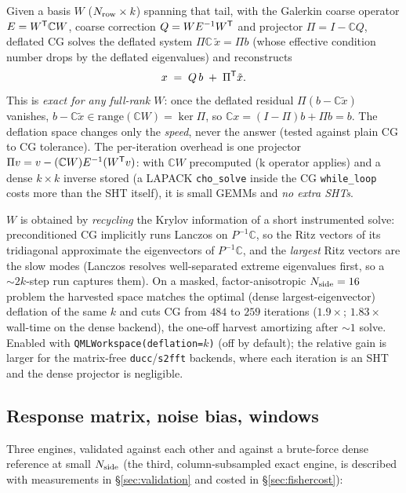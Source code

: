 \documentclass[11pt,a4paper]{article}
\newcommand{\C}{\mathbb{C}}
\begin{document}
Given a basis $W$ ($N_{\rm row}\times k$) spanning that tail, with the
Galerkin coarse operator $E=W^{\sf T}\C W$, coarse correction
$Q=W E^{-1}W^{\sf T}$ and projector $\Pi = I-\C Q$, deflated CG solves the
deflated system $\Pi\C\,\tilde x = \Pi b$ (whose effective condition number
drops by the deflated eigenvalues) and reconstructs
\begin{equation}
  x \;=\; Q\,b \;+\; \Pi^{\sf T}\tilde x .
  \label{eq:deflrecon}
\end{equation}
This is \emph{exact for any full-rank $W$}: once the deflated residual
$\Pi(b-\C\tilde x)$ vanishes, $b-\C\tilde x\in\mathrm{range}(\C W)=\ker\Pi$,
so $\C x=(I-\Pi)b+\Pi b=b$.  The deflation space changes only the
\emph{speed}, never the answer (tested against plain CG to CG tolerance).
The per-iteration overhead is one projector
$\Pi v=v-(\C W)E^{-1}(W^{\sf T}v)$: with $\C W$ precomputed (k operator
applies) and a dense $k\times k$ inverse stored (a LAPACK \texttt{cho\_solve}
inside the CG \texttt{while\_loop} costs more than the SHT itself), it is
small GEMMs and \emph{no extra SHTs}.

$W$ is obtained by \emph{recycling} the Krylov information of a short
instrumented solve: preconditioned CG implicitly runs Lanczos on $P^{-1}\C$,
so the Ritz vectors of its tridiagonal approximate the eigenvectors of
$P^{-1}\C$, and the \emph{largest} Ritz vectors are the slow modes (Lanczos
resolves well-separated extreme eigenvalues first, so a $\sim2k$-step run
captures them).  On a masked, factor-anisotropic $N_{\rm side}=16$ problem
the harvested space matches the optimal (dense largest-eigenvector)
deflation of the same $k$ and cuts CG from $484$ to $259$ iterations
($1.9\times$; $1.83\times$ wall-time on the dense backend), the one-off
harvest amortizing after $\sim1$ solve.  Enabled with
\texttt{QMLWorkspace(deflation=$k$)} (off by default); the relative gain is
larger for the matrix-free \texttt{ducc}/\texttt{s2fft} backends, where each
iteration is an SHT and the dense projector is negligible.

\subsection{Response matrix, noise bias, windows}
\label{sec:fisher}
Three engines, validated against each other and against a brute-force dense
reference at small $N_{\rm side}$ (the third, column-subsampled exact
engine, is described with measurements in \S\ref{sec:validation} and
costed in \S\ref{sec:fishercost}):
\end{document}
